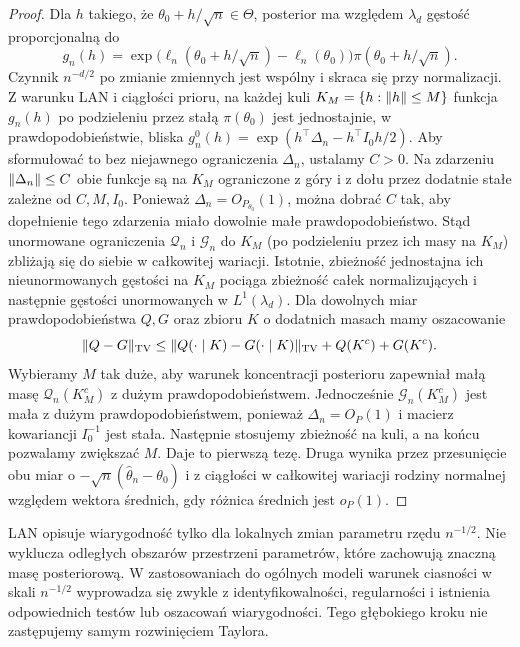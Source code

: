 \begin{proof}
Dla $h$ takiego, że $\theta_0+h/\sqrt n\in\Theta$,
posterior ma względem $\lambda_d$ gęstość proporcjonalną do
\[
 g_n(h)=\exp\big(\ell_n(\theta_0+h/\sqrt n)-\ell_n(\theta_0)\big)
 \pi(\theta_0+h/\sqrt n).
\]
Czynnik $n^{-d/2}$ po zmianie zmiennych jest wspólny
i skraca się przy normalizacji.
Z warunku LAN i ciągłości prioru, na każdej kuli
$K_M=\{h:\lVert h\rVert\le M\}$ funkcja $g_n(h)$
po podzieleniu przez stałą $\pi(\theta_0)$ jest
jednostajnie, w prawdopodobieństwie, bliska
$g_n^0(h)=\exp(h^\top\Delta_n-h^\top I_0h/2)$.
Aby sformułować to bez niejawnego ograniczenia $\Delta_n$,
ustalamy $C>0$. Na zdarzeniu $\lVert\Delta_n\rVert\le C$
obie funkcje są na $K_M$ ograniczone z góry i z dołu
przez dodatnie stałe zależne od $C,M,I_0$.
Ponieważ $\Delta_n=O_{P_{\theta_0}}(1)$,
można dobrać $C$ tak, aby dopełnienie tego zdarzenia
miało dowolnie małe prawdopodobieństwo.
Stąd unormowane ograniczenia $\mathcal Q_n$ i $\mathcal G_n$
do $K_M$ (po podzieleniu przez ich masy na $K_M$)
zbliżają się do siebie w całkowitej wariacji.
Istotnie, zbieżność jednostajna ich nieunormowanych
gęstości na $K_M$ pociąga zbieżność całek normalizujących
i następnie gęstości unormowanych w $L^1(\lambda_d)$.
Dla dowolnych miar prawdopodobieństwa $Q,G$ oraz zbioru
$K$ o dodatnich masach mamy oszacowanie
\[
 \lVert Q-G\rVert_{\rm TV}
 \le \lVert Q(\cdot\mid K)-G(\cdot\mid K)\rVert_{\rm TV}
       +Q(K^c)+G(K^c).
\]
Wybieramy $M$ tak duże, aby warunek koncentracji posterioru
zapewniał małą masę $\mathcal Q_n(K_M^c)$ z dużym
prawdopodobieństwem. Jednocześnie
$\mathcal G_n(K_M^c)$ jest mała z dużym prawdopodobieństwem,
ponieważ $\Delta_n=O_P(1)$ i macierz kowariancji
$I_0^{-1}$ jest stała. Następnie stosujemy zbieżność
na kuli, a na końcu pozwalamy zwiększać $M$.
Daje to pierwszą tezę.
Druga wynika przez przesunięcie obu miar o
$-\sqrt n(\widehat\theta_n-\theta_0)$ i z ciągłości
w całkowitej wariacji rodziny normalnej względem wektora
średnich, gdy różnica średnich jest $o_P(1)$.
\end{proof}

\begin{uwaga}
LAN opisuje wiarygodność tylko dla lokalnych zmian parametru
rzędu $n^{-1/2}$. Nie wyklucza odległych obszarów przestrzeni
parametrów, które zachowują znaczną masę posteriorową.
W zastosowaniach do ogólnych modeli warunek ciasności
w skali $n^{-1/2}$ wyprowadza się zwykle z identyfikowalności,
regularności i istnienia odpowiednich testów lub oszacowań
wiarygodności. Tego głębokiego kroku nie zastępujemy
samym rozwinięciem Taylora.
\end{uwaga}

